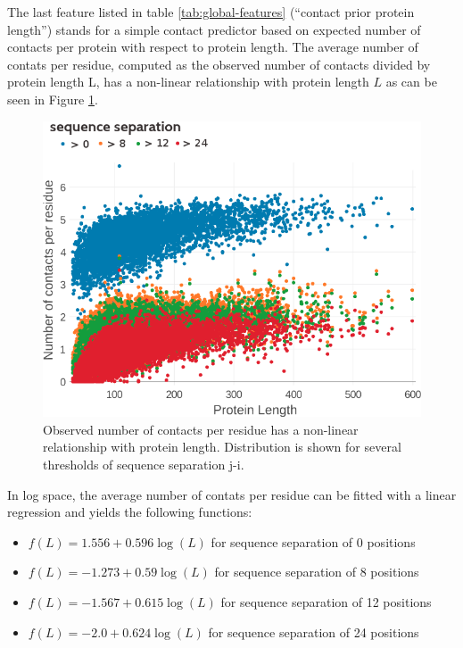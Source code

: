\documentclass[11pt,a4paper,twoside]{book}
\providecommand{\tightlist}{%
  \setlength{\itemsep}{0pt}\setlength{\parskip}{0pt}}
\theoremstyle{definition}
\theoremstyle{definition}
\theoremstyle{remark}
\begin{document}
The last feature listed in table \ref{tab:global-features} (``contact
prior protein length'') stands for a simple contact predictor based on
expected number of contacts per protein with respect to protein length.
The average number of contats per residue, computed as the observed
number of contacts divided by protein length L, has a non-linear
relationship with protein length \(L\) as can be seen in Figure
\ref{fig:avg-nr-contacts-per-residue-vs-protein-length}.






\begin{figure}

{\centering \includegraphics[width=0.8\linewidth]{img/random_forest_contact_prior/no_contacts_per_residue_vs_protein_length_thr8} 

}

\caption{Observed
number of contacts per residue has a non-linear relationship with
protein length. Distribution is shown for several thresholds of sequence
separation \textbar{}j-i\textbar{}.}\label{fig:avg-nr-contacts-per-residue-vs-protein-length}
\end{figure}

In log space, the average number of contats per residue can be fitted
with a linear regression and yields the following functions:

\begin{itemize}
\tightlist
\item
  \(f(L) = 1.556 + 0.596 \log (L)\) for sequence separation of 0
  positions
\item
  \(f(L) = -1.273 + 0.59 \log (L)\) for sequence separation of 8
  positions
\item
  \(f(L) = -1.567 + 0.615 \log (L)\) for sequence separation of 12
  positions
\item
  \(f(L) = -2.0 + 0.624 \log (L)\) for sequence separation of 24
  positions
\end{itemize}
\end{document}
